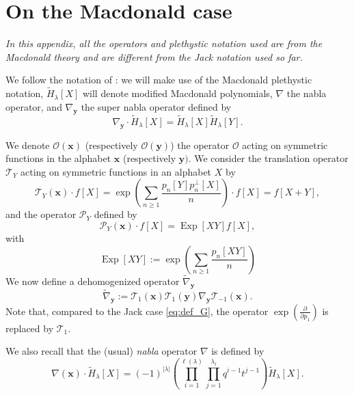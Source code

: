 \documentclass[12pt]{amsart}
\theoremstyle{remark}
\newcommand{\bfx}{\boldsymbol{x}}
\newcommand{\bfy}{\boldsymbol{y}}
\newcommand{\tH}{\widetilde{H}}
\newcommand{\Op}{\mathcal{O}}
\newcommand{\supernabla}{{\nabla}_{\bfy}}
\newcommand{\nablaqt}{\nabla}
\newcommand{\dehsupernabla}{\widetilde{\nabla}_{\boldsymbol{y}}}
\newcommand{\Top}{\mathcal{T}}
\newcommand{\Topqt}{\mathcal{T}}
\DeclareMathOperator{\Exp}{Exp}
\newcommand{\mcO}{\mathcal{O}}
\newcommand{\mcP}{\mathcal{P}}
\begin{document}
\appendix
\section{On the Macdonald case}\label{sec:Macdonald}
\begin{center}
\textit{In this appendix, all the operators and plethystic notation used are from the Macdonald theory and are different from the Jack notation used so far.}
\end{center}

We follow the notation of \cite{BergeronHaglundIraciRomero2023}: we will make use of the Macdonald plethystic notation, $\tH_\lambda[X]$ will denote modified Macdonald polynomials, $\nablaqt$ the nabla operator, and $\nablaqt_{\bfy}$ the super nabla operator defined by 
$$\supernabla\cdot \tH_\lambda[X]=\tH_\lambda[X]\tH_\lambda[Y].$$



We denote $\Op(\bfx)$ (respectively $\mcO(\bfy)$) the operator $\mcO$ acting on symmetric functions in the alphabet $\bfx$ (respectively $\bfy)$. We consider the translation operator $\Top_{Y}$ acting on symmetric functions in an alphabet $X$ by
\begin{equation}\label{eq:Topqt}
\Topqt_Y(\bfx)\cdot f[X]=\exp\left(\sum_{n\geq 1}\frac{p_n[Y]p^\perp_n[X]}{n}\right)\cdot f[X]= f[X+Y],
\end{equation}
and the operator $\mcP_Y$ defined by 
\begin{equation*}
    \mcP_Y(\bfx)\cdot f[X]=\Exp[XY]f[X],
\end{equation*}
with
$$\Exp[XY]:=\exp\left(\sum_{n\geq1}\frac{p_n[XY]}{n}\right)$$
We now define a dehomogenized operator $\dehsupernabla$
$$\dehsupernabla:=\Topqt_{1}(\bfx)\Topqt_1(\bfy)\supernabla \Topqt_{-1}(\bfx).$$
Note that, compared to the Jack case \cref{eq:def_G}, the operator $\exp\left(\frac{\partial}{\partial p_1}\right)$ is replaced by $\Top_1$.

We also recall that the (usual) \emph{nabla} operator $\nabla$ is defined by 
$$\nabla(\bfx)\cdot \tH_\lambda[X]=(-1)^{|\lambda|}\left(\prod_{i=1}^{\ell(\lambda)}\prod_{j=1}^{\lambda_i}q^{i-1}t^{j-1}\right)\tH_\lambda[X].$$
\end{document}

